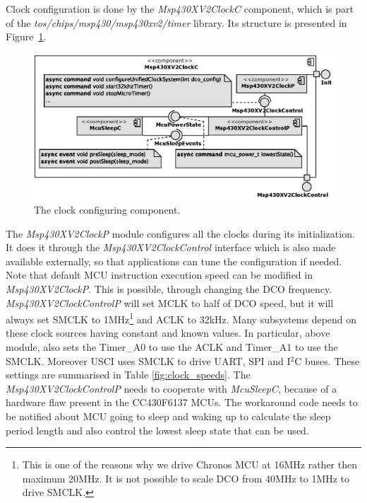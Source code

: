 Clock configuration is done by the \emph{Msp430XV2ClockC} component, which is part of the \emph{tos/chips/msp430/msp430xv2/timer} library. Its structure is presented in Figure~\ref{fig:Msp430XV2ClockC}.
\begin{figure}[h]
  \centering
  \includegraphics[width=1.05\textwidth]{diagrams/Msp430XV2ClockC.eps}
  \caption{The clock configuring component.}
  \label{fig:Msp430XV2ClockC}
\end{figure}
The \emph{Msp430XV2ClockP} module configures all the clocks during its initialization. It does it through the \emph{Msp430XV2ClockControl} interface which is also made available externally, so that applications can tune the configuration if needed. Note that default MCU instruction execution speed can be modified in \emph{Msp430XV2ClockP}. This is possible, through changing the DCO frequency. \emph{Msp430XV2ClockControlP} will set MCLK to half of DCO speed, but it will always set SMCLK to 1MHz\footnote{This is one of the reasons why we drive Chronos MCU at 16MHz rather then maximum 20MHz. It is not possible to scale DCO from 40MHz to 1MHz to drive SMCLK.} and ACLK to 32kHz. Many subsystems depend on these clock sources having constant and known values. In particular, above module, also sets the Timer\_A0 to use the ACLK and Timer\_A1 to use the SMCLK. Moreover USCI uses SMCLK to drive UART, SPI and I$^2$C buses. These settings are summarised in Table \ref{fig:clock_speeds}.
The \emph{Msp430XV2ClockControlP} needs to cooperate with \emph{McuSleepC}, because of a hardware flaw present in the CC430F6137 MCUs. The workaround code needs to be notified about MCU going to sleep and waking up to calculate the sleep period length and also control the lowest sleep state that can be used.
